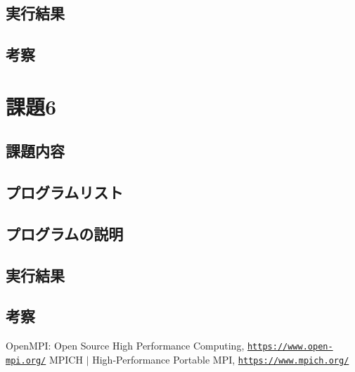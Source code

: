 \documentclass[a4j,titlepage]{jsarticle}
\begin{document}
\subsection{実行結果}

\subsection{考察}


\section{課題6}
\subsection{課題内容}

\subsection{プログラムリスト}

\subsection{プログラムの説明}

\subsection{実行結果}

\subsection{考察}



\begin{thebibliography}{9}
   OpenMPI: Open Source High Performance Computing, \texttt{\url{https://www.open-mpi.org/}}
   MPICH $|$ High-Performance Portable MPI, \texttt{\url{https://www.mpich.org/}}
\end{thebibliography}
\end{document}
